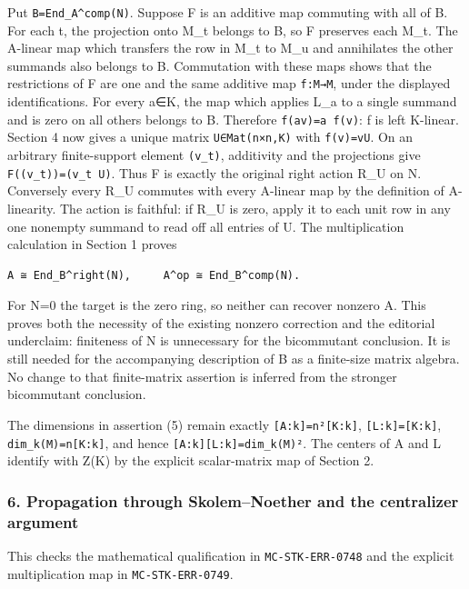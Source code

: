 \documentclass[11pt]{article}
\begin{document}
Put \texttt{B=End\_A\^{}comp(N)}. Suppose F is an additive map commuting with all of B. For each t, the projection onto M\_t belongs to B, so F preserves each M\_t. The A-linear map which transfers the row in M\_t to M\_u and annihilates the other summands also belongs to B. Commutation with these maps shows that the restrictions of F are one and the same additive map \texttt{f:M→M}, under the displayed identifications. For every a∈K, the map which applies L\_a to a single summand and is zero on all others belongs to B. Therefore \texttt{f(av)=a\ f(v)}: f is left K-linear. Section 4 now gives a unique matrix \texttt{U∈Mat(n×n,K)} with \texttt{f(v)=vU}. On an arbitrary finite-support element \texttt{(v\_t)}, additivity and the projections give \texttt{F((v\_t))=(v\_t\ U)}. Thus F is exactly the original right action R\_U on N. Conversely every R\_U commutes with every A-linear map by the definition of A-linearity. The action is faithful: if R\_U is zero, apply it to each unit row in any one nonempty summand to read off all entries of U. The multiplication calculation in Section 1 proves

\begin{verbatim}
A ≅ End_B^right(N),     A^op ≅ End_B^comp(N).
\end{verbatim}

For N=0 the target is the zero ring, so neither can recover nonzero A. This proves both the necessity of the existing nonzero correction and the editorial underclaim: finiteness of N is unnecessary for the bicommutant conclusion. It is still needed for the accompanying description of B as a finite-size matrix algebra. No change to that finite-matrix assertion is inferred from the stronger bicommutant conclusion.

The dimensions in assertion (5) remain exactly \texttt{{[}A:k{]}=n²{[}K:k{]}}, \texttt{{[}L:k{]}={[}K:k{]}}, \texttt{dim\_k(M)=n{[}K:k{]}}, and hence \texttt{{[}A:k{]}{[}L:k{]}=dim\_k(M)²}. The centers of A and L identify with Z(K) by the explicit scalar-matrix map of Section 2.

\subsubsection{6. Propagation through Skolem--Noether and the centralizer argument}\label{propagation-through-skolemnoether-and-the-centralizer-argument}

This checks the mathematical qualification in \texttt{MC-STK-ERR-0748} and the explicit multiplication map in \texttt{MC-STK-ERR-0749}.
\end{document}
